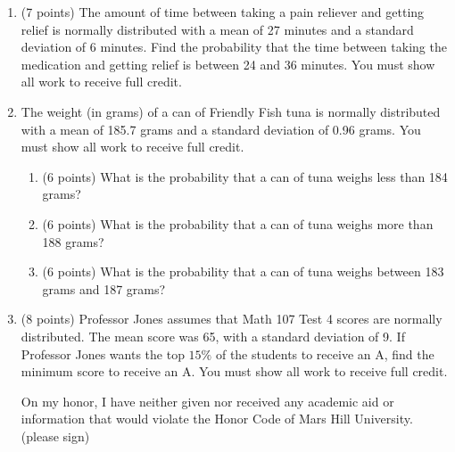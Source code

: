 \documentclass[12pt]{article}
\begin{document}
\begin{enumerate}
\item (7 points) The amount of time between taking a pain reliever and getting relief is normally distributed with a mean of 27 minutes and a standard deviation of 6 minutes.  Find the probability that the time between taking the medication and getting relief is between 24 and 36 minutes.  You must show all work to receive full credit.
\vspace{2.0 in}

\item The weight (in grams) of a can of Friendly Fish tuna is normally distributed with a mean of 185.7 grams and a standard deviation of 0.96 grams.  You must show all work to receive full credit.
\begin{enumerate}
\item (6 points) What is the probability that a can of tuna weighs less than 184 grams?
\vspace{2.5 in}
\item (6 points) What is the probability that a can of tuna weighs more than 188 grams?
\vspace{1.85 in}
\item (6 points) What is the probability that a can of tuna weighs between 183 grams and 187 grams?
\vspace{1.85 in}
\end{enumerate}

\item (8 points) Professor Jones assumes that Math 107 Test 4 scores are normally distributed.  The mean score was 65, with a standard deviation of 9.  If Professor Jones wants the top $15\%$ of the students to receive an A, find the minimum score to receive an A.  You must show all work to receive full credit.

\vspace{2.45 in}


On my honor, I have neither given nor received any academic aid or information that would violate the Honor Code of Mars Hill University. \underline{\hspace{2.0 in}}(please sign)
\end{enumerate}
\end{document}
